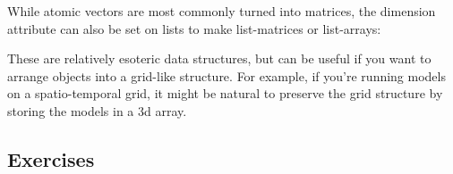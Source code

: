 \begin{Shaded}
\begin{Highlighting}[]
\NormalTok{(}\NormalTok{:}\NormalTok{)                   }
\NormalTok{(}\NormalTok{(}\NormalTok{:}\NormalTok{, } \NormalTok{)) }
\NormalTok{(}\NormalTok{(}\NormalTok{:}\NormalTok{, } \NormalTok{)) }
\NormalTok{(}\NormalTok{(}\NormalTok{:}\NormalTok{, }\NormalTok{))         }
\end{Highlighting}
\end{Shaded}

While atomic vectors are most commonly turned into matrices, the
dimension attribute can also be set on lists to make list-matrices or
list-arrays:  

\begin{Shaded}
\begin{Highlighting}[]
\StringTok{ }\NormalTok{(}\NormalTok{:}\NormalTok{, }\NormalTok{, }\NormalTok{, }\NormalTok{)}
\StringTok{ }\NormalTok{(}\NormalTok{, }\NormalTok{)}
\CommentTok{#>      [,1]      [,2]}
\end{Highlighting}
\end{Shaded}

These are relatively esoteric data structures, but can be useful if you
want to arrange objects into a grid-like structure. For example, if
you're running models on a spatio-temporal grid, it might be natural to
preserve the grid structure by storing the models in a 3d array.

\subsection{Exercises}

